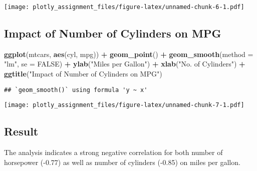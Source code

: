 \documentclass[]{article}
\newenvironment{Shaded}{\begin{snugshade}}{\end{snugshade}}
\newcommand{\DataTypeTok}[1]{\textcolor[rgb]{0.13,0.29,0.53}{#1}}
\newcommand{\KeywordTok}[1]{\textcolor[rgb]{0.13,0.29,0.53}{\textbf{#1}}}
\newcommand{\NormalTok}[1]{#1}
\newcommand{\OperatorTok}[1]{\textcolor[rgb]{0.81,0.36,0.00}{\textbf{#1}}}
\newcommand{\OtherTok}[1]{\textcolor[rgb]{0.56,0.35,0.01}{#1}}
\newcommand{\StringTok}[1]{\textcolor[rgb]{0.31,0.60,0.02}{#1}}
\begin{document}
\texttt{[image: plotly\_assignment\_files/figure-latex/unnamed-chunk-6-1.pdf]}

\hypertarget{impact-of-number-of-cylinders-on-mpg}{%
\subsection{Impact of Number of Cylinders on
MPG}\label{impact-of-number-of-cylinders-on-mpg}}

\begin{Shaded}
\begin{Highlighting}[]
\KeywordTok{ggplot}\NormalTok{(mtcars, }\KeywordTok{aes}\NormalTok{(cyl, mpg)) }\OperatorTok{+}\StringTok{ }\KeywordTok{geom_point}\NormalTok{() }\OperatorTok{+}
\StringTok{  }\KeywordTok{geom_smooth}\NormalTok{(}\DataTypeTok{method =} \StringTok{"lm"}\NormalTok{, }\DataTypeTok{se =} \OtherTok{FALSE}\NormalTok{) }\OperatorTok{+}
\StringTok{  }\KeywordTok{ylab}\NormalTok{(}\StringTok{"Miles per Gallon"}\NormalTok{) }\OperatorTok{+}\StringTok{ }\KeywordTok{xlab}\NormalTok{(}\StringTok{"No. of Cylinders"}\NormalTok{) }\OperatorTok{+}
\StringTok{  }\KeywordTok{ggtitle}\NormalTok{(}\StringTok{"Impact of Number of Cylinders on MPG"}\NormalTok{)}
\end{Highlighting}
\end{Shaded}

\begin{verbatim}
## `geom_smooth()` using formula 'y ~ x'
\end{verbatim}

\texttt{[image: plotly\_assignment\_files/figure-latex/unnamed-chunk-7-1.pdf]}

\hypertarget{result}{%
\subsection{Result}\label{result}}

The analysis indicates a strong negative correlation for both number of
horsepower (-0.77) as well as number of cylinders (-0.85) on miles per
gallon.
\end{document}
